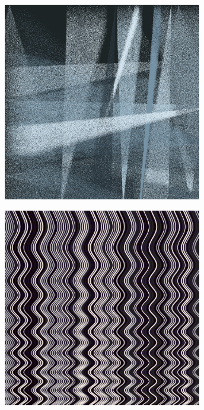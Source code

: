\documentclass[11pt,twoside]{book}
\begin{document}
\begin{figure}[!ht]
\includegraphics[width=246pt]{sci-fi-35a0f90b-73f2-4246-a03d-3400d7672d98.png}
\end{figure}
\newpage
{}
\fancyfoot[CE,CO]{\fontsize{10}{12}\selectfont \thepage}
\begin{figure}[!ht]
\includegraphics[width=246pt]{warm-bw-1e6a7a5e-76bb-480f-8e22-cea19f638d69.png}
\end{figure}
\newpage
{}
\fancyfoot[CE,CO]{\fontsize{10}{12}\selectfont \thepage}
\end{document}

